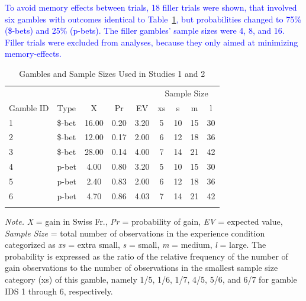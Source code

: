 \documentclass[a4paper, man, natbib, floatsintext]{apa6} %
\begin{document}
\textcolor{blue}{To avoid memory effects between trials, 18 filler trials were shown, that involved six gambles with outcomes identical to Table~\ref{table:Lotteries}, but probabilities changed to 75\% (\$-bets) and 25\% (p-bets). The filler gambles' sample sizes were 4, 8, and 16. Filler trials were excluded from analyses, because they only aimed at minimizing memory-effects.}

\begin{table}[bth]
\begin{center}
\begin{threeparttable}
\caption{Gambles and Sample Sizes Used in Studies 1 and 2\label{table:Lotteries}}
\begin{tabular}{llccccccc}
\toprule
 &  &  &  &  & \multicolumn{4}{c}{Sample Size} \\
\cmidrule(r){6-9}
Gamble ID & Type & X & Pr & EV & xs & s & m & l\\
\midrule
1 & \$-bet & 16.00 & 0.20 & 3.20 & 5 & 10 & 15 & 30\\
2 & \$-bet & 12.00 & 0.17 & 2.00 & 6 & 12 & 18 & 36\\
3 & \$-bet & 28.00 & 0.14 & 4.00 & 7 & 14 & 21 & 42\\
4 & p-bet & 4.00 & 0.80 & 3.20 & 5 & 10 & 15 & 30\\
5 & p-bet & 2.40 & 0.83 & 2.00 & 6 & 12 & 18 & 36\\
6 & p-bet & 4.70 & 0.86 & 4.03 & 7 & 14 & 21 & 42\\
\bottomrule
\addlinespace
\end{tabular}
\begin{tablenotes}[para]
\normalsize{\textit{Note.} \textit{X} = gain in Swiss Fr., \textit{Pr} = probability of gain, \textit{EV} = expected value, \textit{Sample Size} = total number of observations in the experience condition categorized as \textit{xs} = extra small, \textit{s} = small, \textit{m} = medium, \textit{l} = large. The probability is expressed as the ratio of the relative frequency of the number of gain observations to the number of observations in the smallest sample size category (xs) of this gamble, namely 1/5, 1/6, 1/7, 4/5, 5/6, and 6/7 for gamble IDS 1 through 6, respectively.}
\end{tablenotes}
\end{threeparttable}
\end{center}
\end{table}
\end{document}
